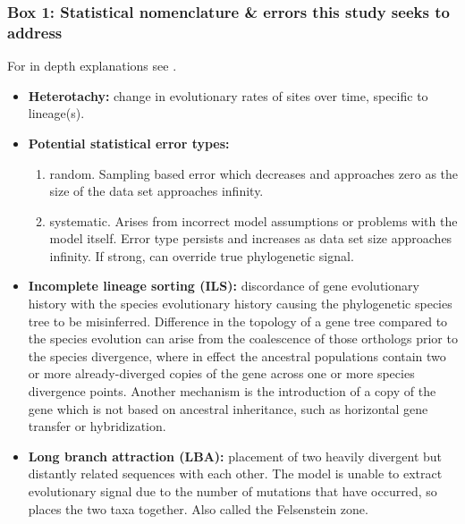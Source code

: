\documentclass[12pt]{article}
\begin{document}
\subsubsection*{Box 1: Statistical nomenclature \& errors this study seeks to address}
For in depth explanations see \cite{yang2014molecular}.
\begin{itemize}
  \setlength{\itemsep}{1pt}
  \setlength{\parskip}{0pt}
  \setlength{\parsep}{0pt}
\item \textbf{Heterotachy:} change in evolutionary rates of sites over time, specific to lineage(s).
\item \textbf{Potential statistical error types:}
\begin{enumerate}
  \setlength{\itemsep}{0pt}
  \setlength{\parskip}{0pt}
  \setlength{\parsep}{0pt}
\item random. Sampling based error which decreases and approaches zero as the size of the data set approaches infinity.\\
\item systematic. Arises from incorrect model assumptions or problems with the model itself. 
Error type persists and increases as data set size approaches infinity. 
If strong, can override true phylogenetic signal.
\end{enumerate}
\item \textbf{Incomplete lineage sorting (ILS):} discordance of gene evolutionary history with the species evolutionary history causing the phylogenetic species tree to be misinferred. 
Difference in the topology of a gene tree compared to the species evolution can arise from the coalescence of those orthologs prior to the species divergence, where in effect the ancestral populations contain two or more already-diverged copies of the gene across one or more species divergence points. 
Another mechanism is the introduction of a copy of the gene which is not based on ancestral inheritance, such as horizontal gene transfer or hybridization.
\item \textbf{Long branch attraction (LBA):} placement of two heavily divergent but distantly related sequences with each other. 
The model is unable to extract evolutionary signal due to the number of mutations that have occurred, so places the two taxa together. 
Also called the Felsenstein zone.
\end{itemize}
\end{document}
